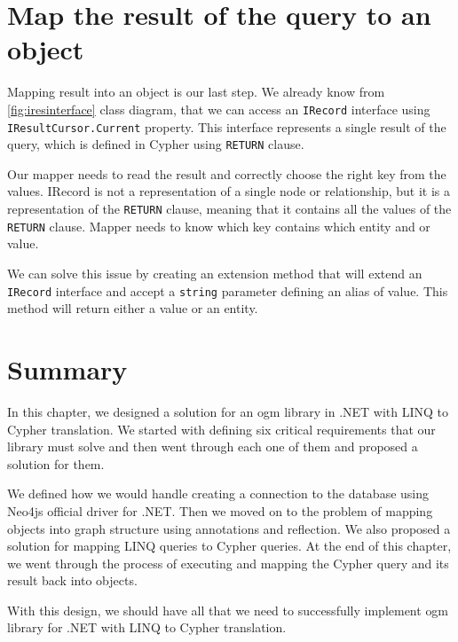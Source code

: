 \section{Map the result of the query to an object}

Mapping result into an object is our last step. We already know from \ref{fig:iresinterface} class diagram,
that we can access an \texttt{IRecord} interface using \texttt{IResultCursor.Current} property.
This interface represents a single result of the query, which is defined in Cypher using \texttt{RETURN} clause.

Our mapper needs to read the result and correctly choose the right key from the values. IRecord is not a representation of a single node or relationship, but it is a representation of the \texttt{RETURN} clause, meaning that it contains all the values of the \texttt{RETURN} clause.
Mapper needs to know which key contains which entity and or value.

We can solve this issue by creating an extension method that will extend an \texttt{IRecord} interface and accept a \texttt{string} parameter defining an alias of value.
This method will return either a value or an entity.

\section{Summary}

In this chapter, we designed a solution for an \acrshort{ogm} library in .NET with LINQ to Cypher translation.
We started with defining six critical requirements that our library must solve and then went through each one of them and
proposed a solution for them.

We defined how we would handle creating a connection to the database using Neo4js official driver for .NET. Then we moved on
to the problem of mapping objects into graph structure using annotations and reflection. We also proposed a solution for mapping LINQ queries to
Cypher queries. At the end of this chapter, we went through the process of executing and mapping the Cypher query and its result back into objects.

With this design, we should have all that we need to successfully implement \acrshort{ogm} library for .NET with LINQ to Cypher translation.

